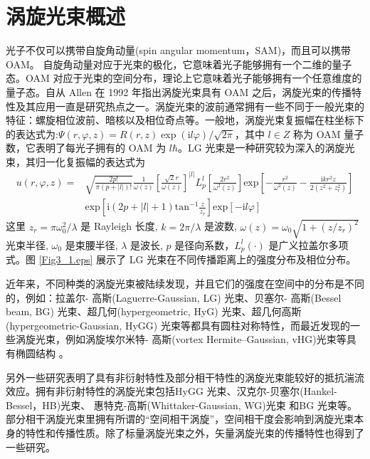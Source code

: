 \documentclass[master]{thesis-uestc}
\begin{document}
\section{涡旋光束概述}
光子不仅可以携带自旋角动量(spin angular momentum，SAM)，而且可以携带 OAM。 自旋角动量对应于光束的极化，它意味着光子能够拥有一个二维的量子态。OAM 对应于光束的空间分布，理论上它意味着光子能够拥有一个任意维度的量子态。自从 Allen 在 1992 年指出涡旋光束具有 OAM 之后，涡旋光束的传播特性及其应用一直是研究热点之一。涡旋光束的波前通常拥有一些不同于一般光束的特征：螺旋相位波前、暗核以及相位奇点等。一般地，涡旋光束复振幅在柱坐标下的表达式为:$\Psi(r,\varphi,z)=R(r,z)\exp{(\mathrm{i}l\varphi)/\sqrt{2\pi}}$，其中 $l\in Z$ 称为 OAM 量子数，它表明了每光子拥有的 OAM 为 $l\hbar$。LG 光束是一种研究较为深入的涡旋光束，其归一化复振幅的表达式为
\begin{equation}\label{LG}
  \begin{array}{rl}
u(r,\varphi,z)=& \displaystyle \sqrt{\frac{2p!}{\pi(p+|l|)!}}\frac{1}{\omega(z)}\left[\frac{\sqrt{2}r}{\omega(z)}\right]^{|l|}L_{p}^{l}\left[\frac{2r^2}{\omega^2(z)}\right]\displaystyle\mathrm{exp}\left[-\frac{r^2}{\omega^2(z)}-\frac{\mathrm{i}kr^{2}z}{2(z^2+z_r^{2})}\right]\\
& \displaystyle\mathrm{exp}\left[\mathrm{i}(2p+|l|+1)\mathrm{tan}^{-1}\frac{z}{z_r}\right]\mathrm{exp}\left[-\mathrm{i}l\varphi\right]
  \end{array}
\end{equation}
\noindent 这里 $z_r=\pi\omega_{0}^2/\lambda$ 是 Rayleigh 长度, $k=2\pi/\lambda$ 是波数, $\omega(z)=\omega_{0}\sqrt{1+(z/z_r)^{2}}$ 光束半径, $\omega_{0}$ 是束腰半径, $\lambda$ 是波长, $p$ 是径向系数，$L_{p}^{l}(\cdot)$ 是广义拉盖尔多项式。图 \ref{Fig3_1.eps} 展示了 LG 光束在不同传播距离上的强度分布及相位分布。

近年来，不同种类的涡旋光束被陆续发现，并且它们的强度在空间中的分布是不同的，例如：拉盖尔- 高斯(Laguerre-Gaussian, LG) 光束、贝塞尔- 高斯(Bessel beam, BG) 光束、超几何(hypergeometric, HyG) 光束、超几何高斯(hypergeometric-Gaussian, HyGG) 光束等都具有圆柱对称特性\citeup{}，而最近发现的一些涡旋光束，例如涡旋埃尔米特- 高斯(vortex Hermite–Gaussian, vHG)光束等具有椭圆结构 \citeup{}。

另外一些研究表明了具有非衍射特性及部分相干特性的涡旋光束能较好的抵抗湍流效应。拥有非衍射特性的涡旋光束包括HyGG 光束\citeup{}、汉克尔-贝塞尔(Hankel-Bessel，HB)光束\citeup{}、 惠特克-高斯(Whittaker-Gaussian, WG)光束\citeup{} 和BG 光束\citeup{}等。部分相干涡旋光束里拥有所谓的“空间相干涡旋”，空间相干度会影响到涡旋光束本身的特性和传播性质\citeup{}。除了标量涡旋光束之外，矢量涡旋光束的传播特性也得到了一些研究\citeup{}。
\end{document}

